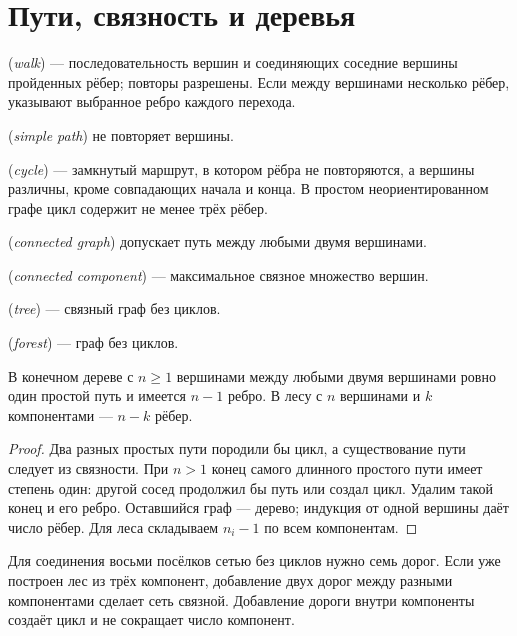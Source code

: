 \section{Пути, связность и деревья}
\begin{definition} (\emph{walk}) --- последовательность вершин и соединяющих соседние вершины пройденных рёбер; повторы разрешены. Если между вершинами несколько рёбер, указывают выбранное ребро каждого перехода. \par{} (\emph{simple path}) не повторяет вершины. \par{} (\emph{cycle}) --- замкнутый маршрут, в котором рёбра не повторяются, а вершины различны, кроме совпадающих начала и конца. В простом неориентированном графе цикл содержит не менее трёх рёбер.\end{definition}
\begin{definition} (\emph{connected graph}) допускает путь между любыми двумя вершинами. \par{} (\emph{connected component}) --- максимальное связное множество вершин. \par{} (\emph{tree}) --- связный граф без циклов. \par{} (\emph{forest}) --- граф без циклов.\end{definition}
\begin{theorem}
В конечном дереве с \(n\ge1\) вершинами между любыми двумя вершинами ровно один простой путь и имеется \(n-1\) ребро. В лесу с \(n\) вершинами и \(k\) компонентами --- \(n-k\) рёбер.
\end{theorem}
\begin{proof}Два разных простых пути породили бы цикл, а существование пути следует из связности. При \(n>1\) конец самого длинного простого пути имеет степень один: другой сосед продолжил бы путь или создал цикл. Удалим такой конец и его ребро. Оставшийся граф --- дерево; индукция от одной вершины даёт число рёбер. Для леса складываем \(n_i-1\) по всем компонентам.\end{proof}
\begin{example}Для соединения восьми посёлков сетью без циклов нужно семь дорог. Если уже построен лес из трёх компонент, добавление двух дорог между разными компонентами сделает сеть связной. Добавление дороги внутри компоненты создаёт цикл и не сокращает число компонент.\end{example}
